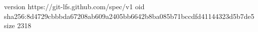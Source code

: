 version https://git-lfs.github.com/spec/v1
oid sha256:8d4729cbbbda67208ab609a2405bb6642b8ba085b71bccdfd41144323d5b7de5
size 2318
